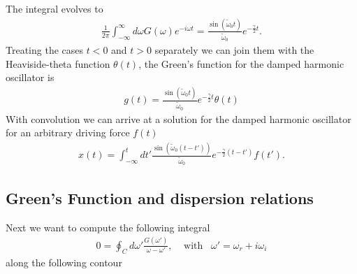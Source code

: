 \documentclass[a4paper]{article}
\begin{document}
The integral evolves to
\begin{align}
    \frac{1}{2\pi} \int_{-\infty}^{\infty} d\omega G(\omega) e^{-i\omega t}=
    \frac{\sin(\tilde{\omega}_0t)}{\tilde{\omega}_0} e^{-\frac{\gamma}{2}t}.
\end{align}
Treating the cases $t<0$ and $t>0$ separately we can join them with the
Heaviside-theta function $\theta(t)$, the Green's function for the damped
harmonic oscillator is
\begin{align}
    g(t) = \frac{\sin(\tilde{\omega}_0t)}{\tilde{\omega}_0}
    e^{-\frac{\gamma}{2}t} \theta(t)
\end{align}
With convolution we can arrive at a solution for the damped harmonic oscillator
for an arbitrary driving force $f(t)$
\begin{align}
    x(t) = \int_{-\infty}^{t} dt'
    \frac{\sin(\tilde{\omega}_0 (t-t'))}{\tilde{\omega}_0}
    e^{-\frac{\gamma}{2}(t-t')} f(t').
\end{align}

\subsection{Green's Function and dispersion relations}
Next we want to compute the following integral
\begin{align}
    0 = \oint_C d\omega' \frac{G(\omega')}{\omega - \omega'}, \;\;\;\;
    \text{with} \;\;\; \omega' = \omega_r + i\omega_i
\end{align}
along the following contour
\end{document}
